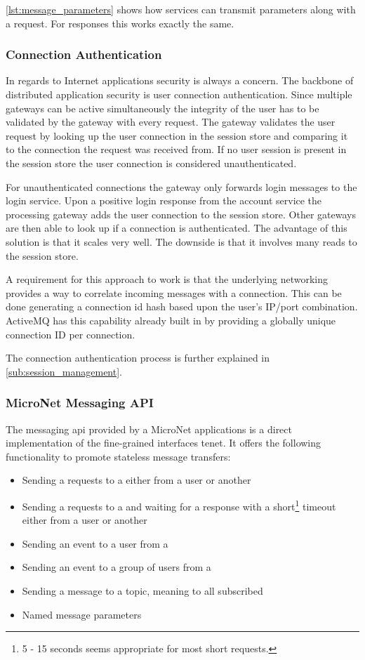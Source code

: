 \autoref{lst:message_parameters} shows how services can transmit parameters
along with a request. For responses this works exactly the same.

\subsubsection{Connection Authentication}

In regards to Internet applications security is always a concern. The backbone
of distributed application security is user connection authentication.
Since multiple gateways can be active simultaneously the integrity of the user
has to be validated by the gateway with every request. The gateway validates the
user request by looking up the user connection in the session store and
comparing it to the connection the request was received from. If no user session
is present in the session store the user connection is considered
unauthenticated.

For unauthenticated connections the gateway only forwards login messages to the
login service. Upon a positive login response from the account service the
processing gateway adds the user connection to the session store. Other gateways
are then able to look up if a connection is authenticated. The advantage of this
solution is that it scales very well. The downside is that it involves many
reads to the session store.

A requirement for this approach to work is that the underlying networking
provides a way to correlate incoming messages with a connection. This can be
done generating a connection id hash based upon the user's IP/port combination.
ActiveMQ has this capability already built in by providing a globally unique
connection ID per connection.

The connection authentication process is further explained in
\autoref{sub:session_management}.

\subsubsection{MicroNet Messaging API}

The messaging \gls{api} provided by a MicroNet applications is a direct implementation
of the fine-grained interfaces tenet. It offers the following functionality to
promote stateless message transfers:

\begin{itemize}
  \item Sending a requests to a \ms{} either from a user or another \ms{}
  \item Sending a requests to a \ms{} and waiting for a response with a
  short\footnote{5 - 15 seconds seems appropriate for most short requests.}
  timeout either from a user or another \ms{}
  \item Sending an event to a user from a \ms{}
  \item Sending an event to a group of users from a \ms{}
  \item Sending a message to a topic, meaning to all subscribed \mss{}
  \item Named message parameters
\end{itemize}

